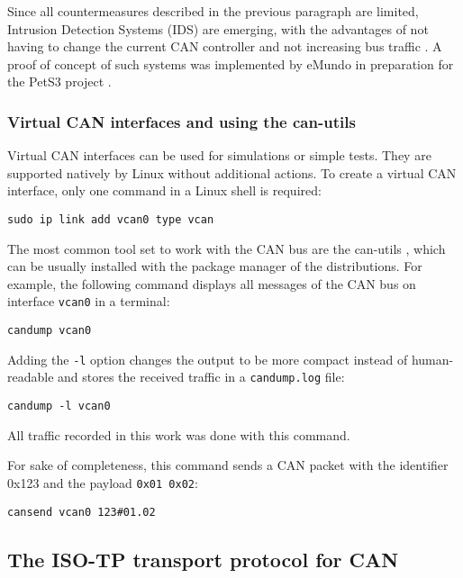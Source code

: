 Since all countermeasures described in the previous paragraph are limited, Intrusion Detection Systems (IDS) are emerging, with the advantages of not having to change the current CAN controller and not increasing bus traffic \cite{Bozdal2020}. A proof of concept of such systems was implemented by eMundo in preparation for the PetS3 project \cite{spahn2018}.

\subsubsection{Virtual CAN interfaces and using the can-utils}
\label{subsubsec:can-utils}

Virtual CAN interfaces can be used for simulations or simple tests. They are supported natively by Linux without additional actions.
To create a virtual CAN interface, only one command in a Linux shell is required:
\begin{verbatim}
sudo ip link add vcan0 type vcan
\end{verbatim}

The most common tool set to work with the CAN bus are the can-utils \cite{can-utils}, which can be usually installed with the package manager of the distributions. For example, the following command displays all messages of the CAN bus on interface \texttt{vcan0} in a terminal:
\begin{verbatim}
candump vcan0
\end{verbatim}

Adding the \texttt{-l} option changes the output to be more compact instead of human-readable and stores the received traffic in a \texttt{candump.log} file:

\begin{verbatim}
candump -l vcan0
\end{verbatim}

All traffic recorded in this work was done with this command.

For sake of completeness, this command sends a CAN packet with the identifier 0x123 and the payload \texttt{0x01 0x02}:
\begin{verbatim}
cansend vcan0 123#01.02
\end{verbatim}

\subsection{The ISO-TP transport protocol for CAN}

